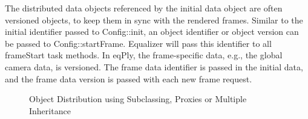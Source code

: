\documentclass[10pt,a4]{scrartcl}
\begin{document}
The distributed data objects referenced by the initial data object are
often versioned objects, to keep them in sync with the rendered
frames. Similar to the initial identifier passed to
\textsf{Config::init}, an object identifier or object version can be
passed to \textsf{Config::startFrame}. Equalizer will pass this
identifier to all \textsf{frameStart} task methods. In \textsf{eqPly},
the frame-specific data, e.g., the global camera data, is versioned. The
frame data identifier is passed in the initial data, and the frame data
version is passed with each new frame request.

\begin{figure}[h!t]
  \hfil
  \hfil
  {\caption{\label{fObjectDist}Object Distribution using Subclassing,
      Proxies or Multiple Inheritance}}
\end{figure}
\end{document}
